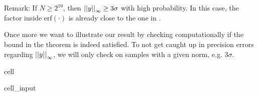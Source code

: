 \documentclass[letterpaper,10pt,english]{jupyterBook}
\begin{document}
\sphinxAtStartPar
Remark: If \(N \ge 2^{10}\), then \(\left\lvert\left\lvert y \right\rvert\right\rvert_\infty \ge 3\sigma\) with high probability.
In this case, the factor inside \(\mathrm{erf}(\cdot)\) is already close to the one in {\hyperref[\detokenize{Thesis:multiplication-bound-uniform-ternary}]{}}.

\sphinxAtStartPar
Once more we want to illustrate our result by checking computationally if the bound in the theorem is indeed satisfied.
To not get caught up in precision errors regarding \(\left\lvert\left\lvert y \right\rvert\right\rvert_\infty\), we will only check on samples with a given norm, e.g. \(3\sigma\).

\begin{sphinxuseclass}{cell}\begin{sphinxVerbatimInput}

\begin{sphinxuseclass}{cell_input}
\begin{sphinxVerbatim}[commandchars=\\\{\}]
          
  
   
        
       
            
      
       
          

\end{sphinxVerbatim}
\end{sphinxuseclass}
\end{sphinxVerbatimInput}
\end{sphinxuseclass}
\end{document}
